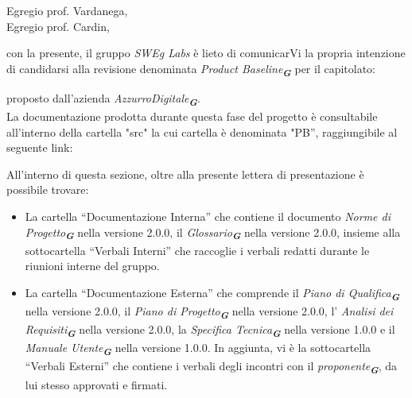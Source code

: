 
\fancyfoot[C]{\thepage} %



Egregio prof. Vardanega, \\
Egregio prof. Cardin, \\
\vspace{0.5cm}

con la presente, il gruppo \emph{SWEg Labs} è lieto di comunicarVi la propria intenzione di candidarsi alla revisione denominata
\emph{Product Baseline}\textsubscript{\textit{\textbf{G}}} per il capitolato:\\
\begin{center}
\end{center}
proposto dall’azienda \emph{AzzurroDigitale}\textsubscript{\textit{\textbf{G}}}.\\
La documentazione prodotta durante questa fase del progetto è consultabile all’interno della cartella "src"
la cui cartella è denominata "PB”, raggiungibile al seguente link: 
\begin{center}
\end{center}
All’interno di questa sezione, oltre alla presente lettera di presentazione è possibile trovare:
\begin{itemize}
\item La cartella “Documentazione Interna” che contiene il documento \emph{Norme di Progetto}\textsubscript{\textit{\textbf{G}}} nella versione 2.0.0, il \emph{Glossario}\textsubscript{\textit{\textbf{G}}} nella versione 2.0.0, insieme alla sottocartella “Verbali Interni” che raccoglie i verbali redatti durante le riunioni interne del gruppo.
\item La cartella “Documentazione Esterna” che comprende il \emph{Piano di Qualifica}\textsubscript{\textit{\textbf{G}}} nella versione 2.0.0, il \emph{Piano di Progetto}\textsubscript{\textit{\textbf{G}}} nella versione 2.0.0, l' \emph{Analisi dei Requisiti}\textsubscript{\textit{\textbf{G}}} nella versione 2.0.0, la \emph{Specifica Tecnica}\textsubscript{\textit{\textbf{G}}} nella versione 1.0.0 e il \emph{Manuale Utente}\textsubscript{\textit{\textbf{G}}} nella versione 1.0.0. In aggiunta, vi è la sottocartella “Verbali Esterni” che contiene i verbali degli incontri con il \emph{proponente}\textsubscript{\textit{\textbf{G}}}, da lui stesso approvati e firmati.
\end{itemize}
